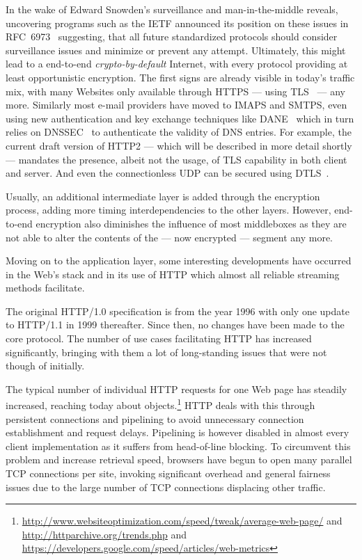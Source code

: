 In the wake of Edward Snowden's surveillance and man-in-the-middle reveals, uncovering programs such as  the \gls{IETF} announced its position on these issues in \gls{RFC}~6973~\cite{rfc6973} suggesting, that all future standardized protocols should consider surveillance issues and minimize or prevent any attempt. Ultimately, this might lead to a end-to-end \textit{crypto-by-default} Internet, with every protocol providing at least opportunistic encryption. The first signs are already visible in today's traffic mix, with many Websites only available through \acrshort{HTTPS} --- using \gls{TLS}~\cite{rfc5246} --- any more. Similarly most e-mail providers have moved to \acrshort{IMAPS} and \acrshort{SMTPS}, even using new authentication and key exchange techniques like \gls{DANE}~\cite{rfc6698} which in turn relies on \gls{DNSSEC}~\cite{rfc4033} to authenticate the validity of \gls{DNS} entries. For example, the current draft version of HTTP2 --- which will be described in more detail shortly --- mandates the presence, albeit not the usage, of \gls{TLS} capability in both client and server. And even the connectionless \gls{UDP} can be secured using \gls{DTLS}~\cite{rfc6347}.

Usually, an additional intermediate layer is added through the encryption process, adding more timing interdependencies to the other layers. However, end-to-end encryption also diminishes the influence of most middleboxes as they are not able to alter the contents of the --- now encrypted --- segment any more.


Moving on to the application layer, some interesting developments have occurred in the Web's stack and in its use of \gls{HTTP} which almost all reliable streaming methods facilitate.

The original HTTP/1.0 specification is from the year 1996 with only one update to HTTP/1.1 in 1999 thereafter. Since then, no changes have been made to the core protocol. The number of use cases facilitating \gls{HTTP} has increased significantly, bringing with them a lot of long-standing issues that were not though of initially.

The typical number of individual \gls{HTTP} requests for one Web page has steadily increased, reaching today about  objects.\footnote{\url{http://www.websiteoptimization.com/speed/tweak/average-web-page/} and \url{http://httparchive.org/trends.php} and \url{https://developers.google.com/speed/articles/web-metrics}} \gls{HTTP} deals with this through persistent connections and pipelining to avoid unnecessary connection establishment and request delays. Pipelining is however disabled in almost every client implementation as it suffers from head-of-line blocking. To circumvent this problem and increase retrieval speed, browsers have begun to open many parallel \gls{TCP} connections per site, invoking significant overhead and general fairness issues due to the large number of \gls{TCP} connections displacing other traffic.

